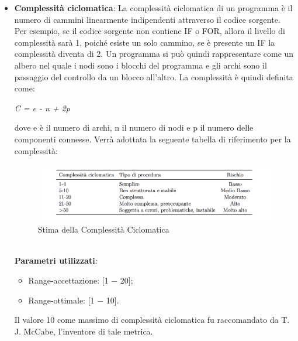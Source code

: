 \begin{itemize}
    \item \textbf{Complessità ciclomatica}:
    La complessità ciclomatica di un programma è il
    numero di cammini linearmente indipendenti attraverso il codice sorgente. Per esempio, se il codice sorgente non contiene IF o FOR, allora il livello di complessità sarà 1, poiché esiste un solo 
    cammino, se è presente un IF la complessità diventa di 2. Un programma si può quindi rappresentare come un albero nel quale i nodi sono i blocchi del programma e gli archi sono il passaggio del controllo da un blocco all'altro. La complessità è quindi definita come:
    \begin{center}
    	\textit{C = e - n + 2p}
    \end{center}
    dove e è il numero di archi, n il numero di nodi e p il numero delle componenti connesse.  Verrà adottata la seguente tabella di riferimento per la complessità: 
    \begin{figure}[h!]
    	\centering
    	\includegraphics[scale=.45]{img/tabella_CC.png}
    	\caption{Stima della Complessità Ciclomatica}
    \end{figure} \\
    
    \textbf{Parametri utilizzati}:
    		\begin{itemize}
    			\item Range-accettazione: [1 − 20];
    			\item Range-ottimale: [1 − 10].
    		\end{itemize}
    		Il valore 10 come massimo di complessità ciclomatica fu raccomandato da T. J. McCabe, l'inventore di tale metrica.


\end{itemize}
